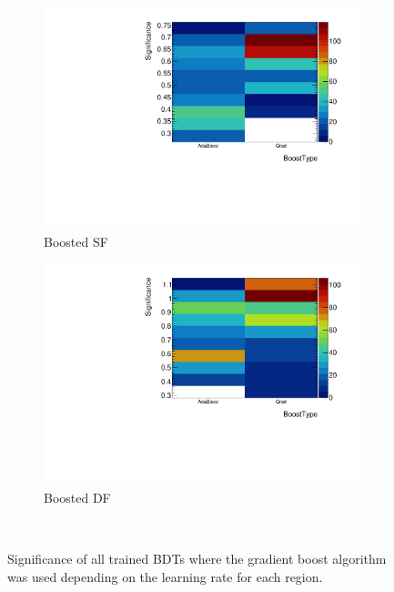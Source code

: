 \begin{figure}[htb]
\begin{subfigure}[t]{0.45\textwidth}
        \includegraphics[width=\textwidth,page=5]{./plots/mva/scan/BOOST_SF_setting_vs_binned_sig.pdf}
        \caption{Boosted SF}
    \end{subfigure}
    \begin{subfigure}[t]{0.45\textwidth}
        \includegraphics[width=\textwidth,page=5]{./plots/mva/scan/BOOST_DF_setting_vs_binned_sig.pdf}
        \caption{Boosted DF}
    \end{subfigure}
    \caption{Significance of all trained BDTs where the gradient boost algorithm was used depending on the learning rate for each region.}~\label{fig:mva:scan:shrinkage}
\end{figure}

